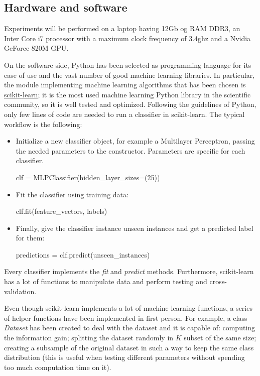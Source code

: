 \documentclass[a4paper, 10pt]{article}
\begin{document}
\subsection{Hardware and software}
Experiments will be performed on a laptop having 12Gb og RAM DDR3, an Inter Core i7 processor with a maximum clock frequency of 3.4ghz and a Nvidia GeForce 820M GPU. 

On the software side, Python has been selected as programming language for its ease of use and the vast number of good machine learning libraries. In particular, the module implementing machine learning algorithms that has been chosen is \href{http://scikit-learn.org/}{scikit-learn}; it is the most used machine learning Python library in the scientific community, so it is well tested and optimized. Following the guidelines of Python, only few lines of code are needed to run a classifier in scikit-learn. The typical workflow is the following:
\begin{itemize}
	\item Initialize a new classifier object, for example a Multilayer Perceptron, passing the needed parameters to the constructor. Parameters are specific for each classifier.
	\begin{center}
		\selectfont
		clf = MLPClassifier(hidden\_layer\_sizes=(25))
	\end{center}

	\item Fit the classifier using training data:
		\begin{center}
		\selectfont
		clf.fit(feature\_vectors, labels)
		\end{center}
	
	\item Finally, give the classifier instance unseen instances and get a predicted label for them:
		\begin{center}
		\selectfont
		predictions = clf.predict(unseen\_instances)
		\end{center}
\end{itemize}

Every classifier implements the \emph{fit} and \emph{predict} methods. Furthermore, scikit-learn has a lot of functions to manipulate data and perform testing and cross-validation.

Even though scikit-learn implements a lot of machine learning functions, a series of helper functions have been implemented in first person. For example, a class \emph{Dataset} has been created to deal with the dataset and it is capable of: computing the information gain; splitting the dataset randomly in $K$ subset of the same size; creating a subsample of the original dataset in such a way to keep the same class distribution (this is useful when testing different parameters without spending too much computation time on it).
\end{document}
